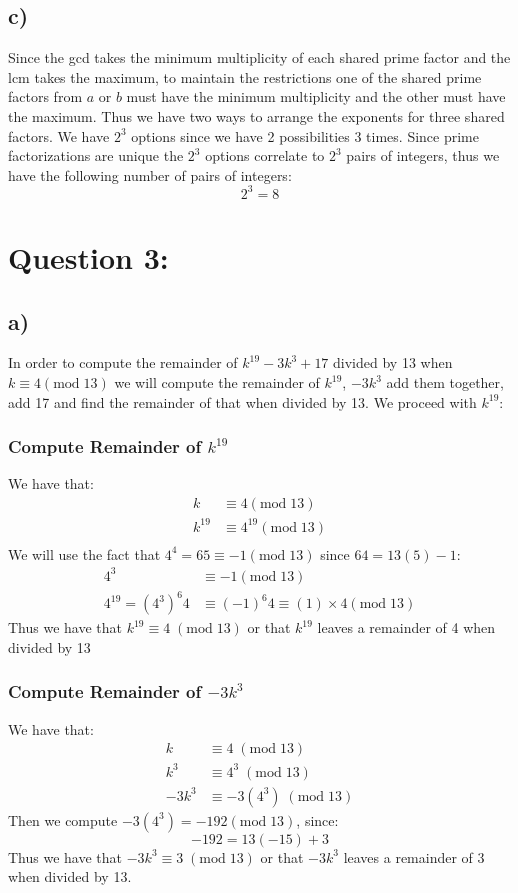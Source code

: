 \documentclass{article}
\begin{document}
\subsection*{c)}
Since the gcd takes the minimum multiplicity of each shared prime factor and the lcm takes the maximum, to maintain the restrictions one of the shared prime factors from $a$ or $b$ must have the minimum multiplicity and the other must have the maximum. 
Thus we have two ways to arrange the exponents for three shared factors. We have $2^{3}$ options since we have 2 possibilities 3 times. Since prime factorizations are unique the $2^{3}$ options correlate to $2^{3}$ pairs of integers, thus we have the following number of pairs of integers:
$$2^{3}=8$$
\newpage

\section*{Question 3:}
\subsection*{a)}
In order to compute the remainder of $k^{19}-3k^{3}+17$ divided by 13 when $k \equiv 4 (\text{mod}\; 13)$ we will compute the remainder of $k^{19}$, $-3k^{3}$ add them together, add 17 and find the remainder of that when divided by 13. We proceed with $k^{19}$:\\
\subsubsection*{Compute Remainder of $k^{19}$}
We have that: $$\begin{aligned}
    k &\equiv 4 (\text{mod}\; 13)\\
    k^{19} &\equiv 4^{19} (\text{mod}\; 13)\\
\end{aligned}$$
We will use the fact that $4^{4}=65 \equiv -1 (\text{mod}\; 13)$ since $64=13(5)-1$:
$$\begin{aligned}
    4^{3} &\equiv -1 (\text{mod}\; 13)\\
    4^{19}=(4^{3})^{6}4 &\equiv (-1)^{6}4 \equiv (1)\times 4 (\text{mod}\; 13)
\end{aligned}$$
Thus we have that $ k^{19} \equiv 4\; (\text{mod}\; 13)$ or that $k^{19}$ leaves a remainder of 4 when divided by 13
\subsubsection*{Compute Remainder of $-3k^{3}$}
We have that: $$\begin{aligned}
    k &\equiv 4\; (\text{mod}\; 13)\\
    k^{3} &\equiv 4^{3}\; (\text{mod}\; 13)\\
    -3k^{3} &\equiv -3(4^{3})\; (\text{mod}\; 13)
\end{aligned}$$
Then we compute $-3(4^{3})=-192 (\text{mod}\; 13)$, since: $$-192=13(-15)+3$$
Thus we have that $-3k^{3} \equiv 3\; (\text{mod}\; 13)$ or that $-3k^{3}$ leaves a remainder of 3 when divided by 13.
\end{document}
